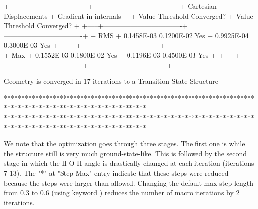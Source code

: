 \begin{sourcelisting}
       +----------------------------------+----------------------------------+
       +    Cartesian Displacements       +    Gradient in internals         +
       +  Value      Threshold Converged? +  Value      Threshold Converged? +
 +-----+----------------------------------+----------------------------------+
 + RMS + 0.1458E-03  0.1200E-02     Yes   + 0.9925E-04  0.3000E-03     Yes   +
 +-----+----------------------------------+----------------------------------+
 + Max + 0.1552E-03  0.1800E-02     Yes   + 0.1196E-03  0.4500E-03     Yes   +
 +-----+----------------------------------+----------------------------------+

 Geometry is converged in  17 iterations to a Transition State Structure

*****************************************************************************************************************
*****************************************************************************************************************
\end{sourcelisting}
 
We note that the optimization goes through three stages. The first one is while the structure still is
very much ground-state-like. This is followed by the second stage in which the H-O-H angle is drastically
changed at each iteration (iterations 7-13). The "*" at "Step Max" entry indicate that these steps were
reduced because the steps were larger than allowed.
Changing the default max step length from 0.3 to 0.6 (using keyword )
reduces the number of macro iterations by 2 iterations.
